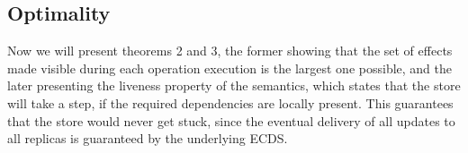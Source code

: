 \subsection{Optimality}
Now we will present theorems 2 and 3, the former showing that the set of effects made visible during each
operation execution is the largest one possible, and the later
presenting the liveness property of the semantics, which states that the
store will take a step, if the required dependencies are locally
present. This guarantees that the store would never get stuck, since the
eventual delivery of all updates to all replicas is guaranteed 
by the underlying ECDS.


























